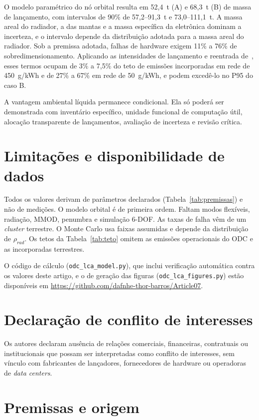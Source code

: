 \documentclass[11pt,a4paper]{article}
\begin{document}
O modelo paramétrico do nó orbital resulta em 52,4~t (A) e 68,3~t (B) de massa
de lançamento, com intervalos de 90\% de 57,2--91,3~t e 73,0--111,1~t. A massa
areal do radiador, a das mantas e a massa específica da eletrônica dominam a
incerteza, e o intervalo depende da distribuição adotada para a massa areal do
radiador. Sob a premissa adotada, falhas de hardware exigem 11\% a 76\% de
sobredimensionamento. Aplicando as intensidades de lançamento e reentrada
de~\cite{r18}, esses termos ocupam de 3\% a 7,5\% do teto de emissões
incorporadas em rede de 450~g/kWh e de 27\% a 67\% em rede de 50~g/kWh, e
podem excedê-lo no P95 do caso B.

A vantagem ambiental líquida permanece condicional. Ela só poderá ser
demonstrada com inventário específico, unidade funcional de computação útil,
alocação transparente de lançamentos, avaliação de incerteza e revisão crítica.

\section*{Limitações e disponibilidade de dados}
Todos os valores derivam de parâmetros declarados (Tabela~\ref{tab:premissas})
e não de medições. O modelo orbital é de primeira ordem. Faltam modos flexíveis,
radiação, MMOD, penumbra e simulação 6-DOF. As taxas de falha vêm de um
\emph{cluster} terrestre. O Monte Carlo usa faixas assumidas e depende da
distribuição de $\rho_{rad}$. Os tetos da Tabela~\ref{tab:teto} omitem as
emissões operacionais do ODC e as incorporadas terrestres.

O código de cálculo (\texttt{odc\_lca\_model.py}), que inclui verificação
automática contra os valores deste artigo, e o de geração das figuras
(\texttt{odc\_lca\_figures.py}) estão disponíveis em
\url{https://github.com/dafnhe-thor-barros/Article07}.

\section*{Declaração de conflito de interesses}
Os autores declaram ausência de relações comerciais, financeiras, contratuais ou
institucionais que possam ser interpretadas como conflito de interesses, sem
vínculo com fabricantes de lançadores, fornecedores de hardware ou operadoras
de \emph{data centers}.

\appendix
\section{Premissas e origem}
\end{document}
